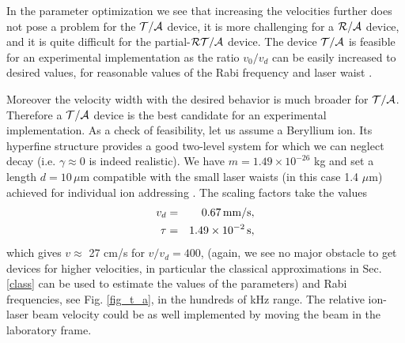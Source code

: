In the parameter optimization we see that increasing the velocities further does not pose a problem for the ${\cal T/A}$
device, it is more challenging for a ${\cal R/A}$ device, and it is quite difficult for the partial-${\cal RT/A}$ device.  The device ${\cal T/A}$ is feasible for an experimental implementation  as the ratio $v_0/v_d$ can be easily increased to desired values, for  reasonable values of the
Rabi frequency and laser waist \cite{Zeyen2016}.

Moreover the velocity width with the desired behavior is much broader for ${\cal T/A}$. Therefore a ${\cal T/A}$
device is the best candidate for
an experimental implementation.
As a check of feasibility, let us assume a Beryllium ion. Its hyperfine structure provides a good  two-level system
for which we can neglect decay (i.e. $\gamma\approx 0$ is indeed realistic). We have $m=1.49\times 10^{-26}$ kg
and set a length $d=10\, \mu$m compatible with the small laser waists (in this case 1.4 $\mu$m) achieved for individual ion
addressing \cite{Zeyen2016}. The scaling factors take the values
%
\begin{eqnarray}
	v_d&=&0.67\, {\rm mm/s},
	\nonumber\\
	\tau&=&1.49\times 10^{-2}\, {\rm s},
	\nonumber
\end{eqnarray}
%
which gives  $v\approx$ 27 cm/s for $v/v_d=400$, (again, we see no major obstacle to get devices for higher velocities,
in particular the classical approximations in Sec. \ref{class} can be used to  estimate the values of the parameters)
and Rabi frequencies, see Fig. \ref{fig_t_a},  in the hundreds of kHz range. The relative ion-laser beam velocity could be as well
implemented  by moving the beam in the laboratory frame.

%
%
